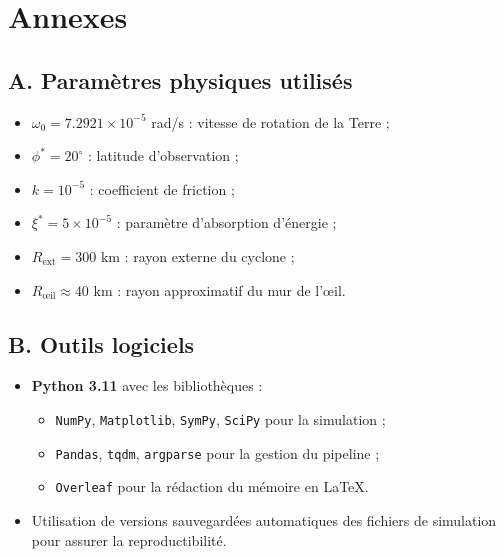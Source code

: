 
\chapter{Annexes}

\section*{A. Param\`etres physiques utilis\'es}
\begin{itemize}
    \item $\omega_0 = 7.2921 \times 10^{-5}$ rad/s : vitesse de rotation de la Terre ;
    \item $\phi^* = 20^\circ$ : latitude d'observation ;
    \item $k = 10^{-5}$ : coefficient de friction ;
    \item $\xi^* = 5 \times 10^{-5}$ : param\`etre d'absorption d'\'energie ;
    \item $R_{\text{ext}} = 300$ km : rayon externe du cyclone ;
    \item $R_{\text{\oe il}} \approx 40$ km : rayon approximatif du mur de l'\oe il.
\end{itemize}

\section*{B. Outils logiciels}
\begin{itemize}
    \item \textbf{Python 3.11} avec les biblioth\`eques :
    \begin{itemize}
        \item \texttt{NumPy}, \texttt{Matplotlib}, \texttt{SymPy}, \texttt{SciPy} pour la simulation ;
        \item \texttt{Pandas}, \texttt{tqdm}, \texttt{argparse} pour la gestion du pipeline ;
        \item \texttt{Overleaf} pour la r\'edaction du m\'emoire en \LaTeX.
    \end{itemize}
    \item Utilisation de versions sauvegard\'ees automatiques des fichiers de simulation pour assurer la reproductibilit\'e.
\end{itemize}

